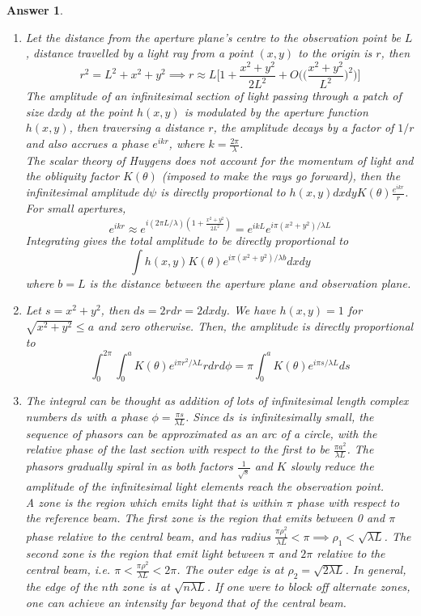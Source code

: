 \documentclass[a4paper]{article}
\newtheorem{ans}{Answer}[subsection]
\theoremstyle{new}
\begin{document}
\begin{ans}\leavevmode
\begin{enumerate}[label=(\roman*)]
\item Let the distance from the aperture plane's centre to the observation point be $L$, distance travelled by a light ray from a point $(x,y)$ to the origin is $r$, then 
$$r^2=L^2+x^2+y^2\implies r\approx L\bigg[1+\frac{x^2+y^2}{2L^2}+O\bigg(\bigg(\frac{x^2+y^2}{L^2}\bigg)^2\bigg)\bigg]$$
The amplitude of an infinitesimal section of light passing through a patch of size $dxdy$ at the point $h(x,y)$ is modulated by the aperture function $h(x,y)$, then traversing a distance $r$, the amplitude decays by a factor of $1/r$ and also accrues a phase $e^{ikr}$, where $k=\frac{2\pi}{\lambda}$.\\[5pt]
The scalar theory of Huygens does not account for the momentum of light and the obliquity factor $K(\theta)$ (imposed to make the rays go forward), then the infinitesimal amplitude $d\psi$ is directly proportional to $h(x,y)dxdyK(\theta)\frac{e^{ikr}}{r}$. For small apertures,
$$e^{ikr}\approx e^{i(2\pi L/\lambda)(1+\frac{x^2+y^2}{2L^2})}=e^{ikL}e^{i\pi(x^2+y^2)/\lambda L}$$
Integrating gives the total amplitude to be directly proportional to
$$\int h(x,y)K(\theta)e^{i\pi(x^2+y^2)/\lambda b}dxdy$$
where $b=L$ is the distance between the aperture plane and observation plane.
\item Let $s=x^2+y^2$, then $ds=2rdr=2dxdy$. We have $h(x,y)=1$ for $\sqrt{x^2+y^2}\leq a$ and zero otherwise. Then, the amplitude is directly proportional to
$$\int_0^{2\pi}\int_0^aK(\theta)e^{i\pi r^2/\lambda L}rdrd\phi=\pi\int_0^aK(\theta)e^{i\pi s/\lambda L}ds$$
\item The integral can be thought as addition of lots of infinitesimal length complex numbers $ds$ with a phase $\phi=\frac{\pi s}{\lambda L}$. Since $ds$ is infinitesimally small, the sequence of phasors can be approximated as an arc of a circle, with the relative phase of the last section with respect to the first to be $\frac{\pi a^2}{\lambda L}$. The phasors gradually spiral in as both factors $\frac{1}{\sqrt{s}}$ and $K$ slowly reduce the amplitude of the infinitesimal light elements reach the observation point.\\[5pt]
A zone is the region which emits light that is within $\pi$ phase with respect to the reference beam. The first zone is the region that emits between 0 and $\pi$ phase relative to the central beam, and has radius $\frac{\pi\rho_1^2}{\lambda L}<\pi\implies\rho_1<\sqrt{\lambda L}$. The second zone is the region that emit light between $\pi$ and $2\pi$ relative to the central beam, i.e. $\pi<\frac{\pi\rho^2}{\lambda L}<2\pi$. The outer edge is at $\rho_2=\sqrt{2\lambda L}$. In general, the edge of the $n$th zone is at $\sqrt{n\lambda L}$. If one were to block off alternate zones, one can achieve an intensity far beyond that of the central beam.

\end{enumerate}
\end{ans}
\end{document}
